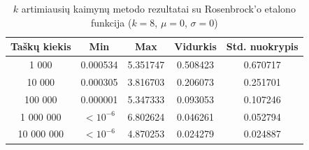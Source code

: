 \begin{table}[H]
    \centering
    \begin{tabular}{|c|c|c|c|c|}
        \hline
        \textbf{Taškų kiekis} & \textbf{Min} & \textbf{Max} & \textbf{Vidurkis} & \textbf{Std. nuokrypis} \\ \hline
        1 000        & 0.000534 & 5.351747 & 0.508423 & 0.670717 \\ \hline
        10 000       & 0.000305 & 3.816703 & 0.206073 & 0.251701 \\ \hline
        100 000      & 0.000001 & 5.347333 & 0.093053 & 0.107246 \\ \hline
        1 000 000    & $<10^{-6}$ & 6.802624 & 0.046261 & 0.052794 \\ \hline
        10 000 000   & $<10^{-6}$ & 4.870253 & 0.024279 & 0.024887 \\ \hline
    \end{tabular}
    \caption{$k$ artimiausių kaimynų metodo rezultatai su Rosenbrock'o etalono funkcija ($k = 8$, $\mu = 0$, $\sigma = 0$)}
\end{table}